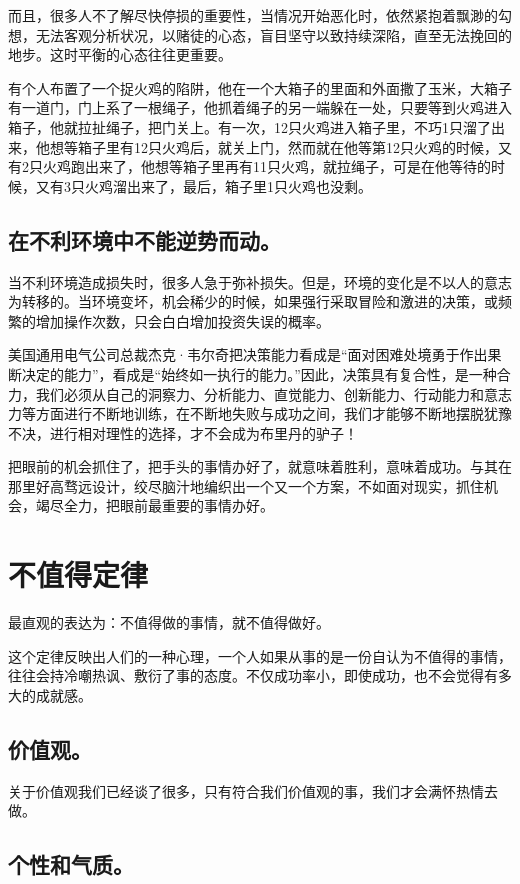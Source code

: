 \documentclass[11pt]{ctexart}
\begin{document}
而且，很多人不了解尽快停损的重要性，当情况开始恶化时，依然紧抱着飘渺的勾想，无法客观分析状况，以赌徒的心态，盲目坚守以致持续深陷，直至无法挽回的地步。这时平衡的心态往往更重要。

有个人布置了一个捉火鸡的陷阱，他在一个大箱子的里面和外面撒了玉米，大箱子有一道门，门上系了一根绳子，他抓着绳子的另一端躲在一处，只要等到火鸡进入箱子，他就拉扯绳子，把门关上。有一次，12只火鸡进入箱子里，不巧1只溜了出来，他想等箱子里有12只火鸡后，就关上门，然而就在他等第12只火鸡的时候，又有2只火鸡跑出来了，他想等箱子里再有11只火鸡，就拉绳子，可是在他等待的时候，又有3只火鸡溜出来了，最后，箱子里1只火鸡也没剩。
\subsection{在不利环境中不能逆势而动。}
\label{sec-16-5}


当不利环境造成损失时，很多人急于弥补损失。但是，环境的变化是不以人的意志为转移的。当环境变坏，机会稀少的时候，如果强行采取冒险和激进的决策，或频繁的增加操作次数，只会白白增加投资失误的概率。

美国通用电气公司总裁杰克·韦尔奇把决策能力看成是“面对困难处境勇于作出果断决定的能力”，看成是“始终如一执行的能力。”因此，决策具有复合性，是一种合力，我们必须从自己的洞察力、分析能力、直觉能力、创新能力、行动能力和意志力等方面进行不断地训练，在不断地失败与成功之间，我们才能够不断地摆脱犹豫不决，进行相对理性的选择，才不会成为布里丹的驴子！

把眼前的机会抓住了，把手头的事情办好了，就意味着胜利，意味着成功。与其在那里好高骛远设计，绞尽脑汁地编织出一个又一个方案，不如面对现实，抓住机会，竭尽全力，把眼前最重要的事情办好。
\section{不值得定律}
\label{sec-17}


最直观的表达为：不值得做的事情，就不值得做好。

这个定律反映出人们的一种心理，一个人如果从事的是一份自认为不值得的事情，往往会持冷嘲热讽、敷衍了事的态度。不仅成功率小，即使成功，也不会觉得有多大的成就感。
\subsection{价值观。}
\label{sec-17-1}


关于价值观我们已经谈了很多，只有符合我们价值观的事，我们才会满怀热情去做。
\subsection{个性和气质。}
\label{sec-17-2}
\end{document}
